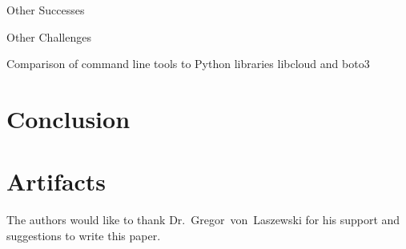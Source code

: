 Other Successes

Other Challenges

Comparison of command line tools to Python libraries libcloud and boto3

\section{Conclusion}

\section{Artifacts}

\begin{acks}

  The authors would like to thank Dr.~Gregor~von~Laszewski for his
  support and suggestions to write this paper.

\end{acks}


 

